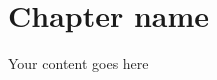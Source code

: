 \documentclass[../main.tex]{subfiles}
\begin{document}
	\justifying


	\chapter{Chapter name}
	\label{chap:chapter-ref}

	Your content goes here

	\newpage
\end{document}
